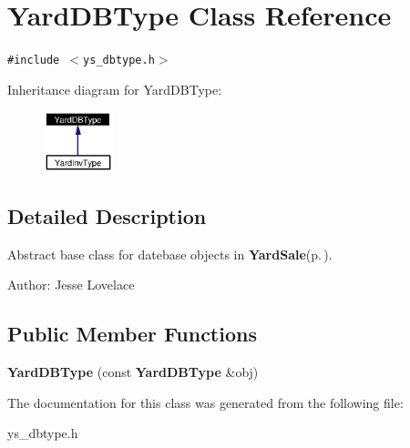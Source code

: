 \section{Yard\-DBType Class Reference}
\label{classYardDBType}
{\tt \#include $<$ys\_\-dbtype.h$>$}

Inheritance diagram for Yard\-DBType:\begin{figure}[H]
\begin{center}
\leavevmode
\includegraphics[width=57pt]{classYardDBType__inherit__graph}
\end{center}
\end{figure}


\subsection{Detailed Description}
Abstract base class for datebase objects in {\bf Yard\-Sale}{\rm (p.\,\pageref{classYardSale})}. 

\begin{Desc}
\item[Author:]Jesse Lovelace \end{Desc}


\subsection*{Public Member Functions}
\begin{CompactItemize}
\item 
{\bf Yard\-DBType} (const {\bf Yard\-DBType} \&obj)\label{classYardDBType_a1}

\end{CompactItemize}


The documentation for this class was generated from the following file:\begin{CompactItemize}
\item 
ys\_\-dbtype.h\end{CompactItemize}
